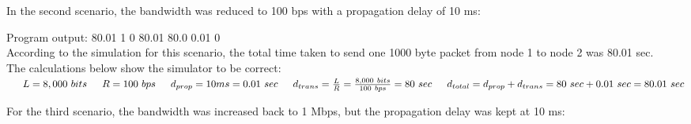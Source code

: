 \documentclass[11pt]{article}
\begin{document}
\noindent
In the second scenario, the bandwidth was reduced to 100 bps with a propagation delay of 10 ms:


\noindent
Program output: 80.01 1 0 80.01 80.0 0.01 0\\
According to the simulation for this scenario, the total time taken to send one 1000 byte packet from node 1 to node 2 was 80.01 sec.\\
The calculations below show the simulator to be correct:\\
$\indent L = 8,000\ bits \\
\indent R = 100\ bps \\
\indent d_{prop} = 10ms = 0.01\ sec \\
\indent d_{trans} = \frac{L}{R} = \frac{8,000\ bits}{100\ bps} = 80\ sec \\
\indent d_{total} = d_{prop} + d_{trans} = 80\ sec + 0.01\ sec = 80.01\ sec$
\\
\vspace{0.25cm}

\noindent
For the third scenario, the bandwidth was increased back to 1 Mbps, but the propagation delay was kept at 10 ms:

\end{document}
